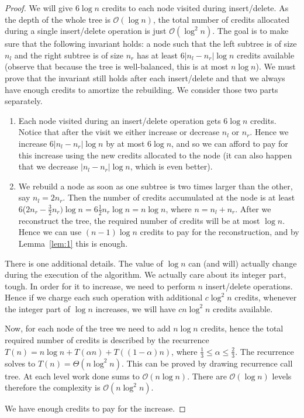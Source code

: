 \documentclass[10pt,a4paper]{article}
\newcommand{\Oh}{\mathcal{O}}
\begin{document}
\begin{proof}

We will give $6\log n$ credits to each node visited during insert/delete. As the depth of the whole tree is $\Oh(\log n)$, the total number of credits allocated during a single insert/delete operation is just $\Oh(\log^{2}n)$. The goal is to make sure that the following invariant holds: a node such that the left subtree is of size $n_{l}$ and the right subtree is of size $n_{r}$ has at least $6|n_{l}-n_{r}|\log n$ credits available (observe that because the tree is well-balanced, this is at most $n\log n$). We must prove that the invariant still holds after each insert/delete and that we always have enough credits to amortize the rebuilding. We consider those two parts separately.

\begin{enumerate}

\item Each node visited during an insert/delete operation gets $6\log n$ credits. Notice that after the visit we either increase or decrease $n_{l}$ or $n_{r}$. Hence we increase $6|n_{l}-n_{r}|\log n$ by at most $6\log n$, and so we can afford to pay for this increase using the new credits allocated to the node (it can also happen that we decrease $|n_{l}-n_{r}|\log n$, which is even better).

\item We rebuild a node as soon as one subtree is two times larger than the other, say $n_{l} = 2n_{r}$. Then the number of credits accumulated at the node is at least 6($2n_{r}-\frac{3}{2}n_{r}
)\log n = 6\frac{1}{2}n_{r}\log n = n\log n$, where $n=n_{l}+n_{r}$. After we reconstruct the tree, the required number of credits will be at most $\log n$. Hence we can use $(n-1)\log n$ credits to pay for the reconstruction, and by Lemma~\ref{lem:1} this is enough.

\end{enumerate}

There is one additional details. The value of $\log n$ can (and will) actually change during the execution of the algorithm. We actually care about its integer part, tough. In order for it to increase, we need to perform $n$ insert/delete operations. Hence if we charge each such operation with additional $c\log^{2} n$ credits, whenever the integer part of $\log n$ increases, we will have $cn\log^{2} n$ credits available. 

Now, for each node of the tree we need to add $n\log n$ credits, hence the total required number of credits is described by the recurrence $T(n)=n\log n+T(\alpha n)+T((1-\alpha)n)$, where $\frac{1}{3}\leq \alpha \leq \frac{2}{3}$. The recurrence solves to $T(n)=\Theta(n\log^{2}n)$. This can be proved by drawing recurrence call tree. At each level work done sums to $\Oh(n \log n)$. There are $\Oh(\log n)$ levels therefore the complexity is $\Oh(n \log^2 n)$.

We have enough credits to pay for the increase.
\end{proof}
\end{document}
